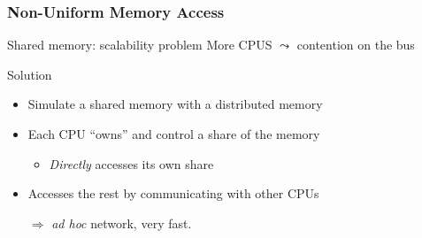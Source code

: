 \documentclass[xcolor={x11names,svgnames,psnames}]{beamer}
\begin{document}
  
  
  



\begin{frame}
  \frametitle{Non-Uniform Memory Access}

  \begin{alertblock}{Shared memory: scalability problem}
    More CPUS $\leadsto$ contention on the bus
  \end{alertblock}

  \begin{exampleblock}{Solution}
    \begin{itemize}
    \item Simulate a shared memory with a distributed memory
    \item Each CPU ``owns'' and control a share of the memory
      \begin{itemize}
      \item \emph{Directly} accesses its own share 
      \end{itemize}
    \item Accesses the rest by communicating with other CPUs
    \item[$\Rightarrow$] \textit{ad hoc} network, very fast.
    \end{itemize}
  \end{exampleblock}
\end{frame}

\end{document}
